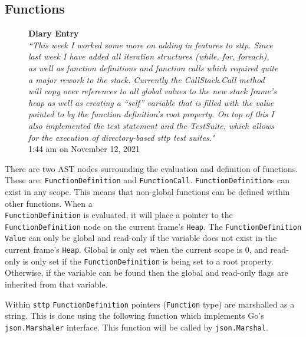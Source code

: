 \subsection{Functions}

\begin{figure}[H]
    \begin{center}
        \textbf{Diary Entry}\\[0.5em]
        \textit{``This week I worked some more on adding in features to sttp. Since last week I have added all iteration structures (while, for, foreach), as well as function definitions and function calls which required quite a major rework to the stack. Currently the CallStack.Call method will copy over references to all global values to the new stack frame’s heap as well as creating a “self” variable that is filled with the value pointed to by the function definition’s root property. On top of this I also implemented the test statement and the TestSuite, which allows for the execution of directory-based sttp test suites."}\\[0.5em]
        \tiny{1:44 am on November 12, 2021}
    \end{center}
\end{figure}

There are two AST nodes surrounding the evaluation and definition of functions. These are: \verb|FunctionDefinition| and \verb|FunctionCall|. \verb|FunctionDefinition|s can exist in any scope. This means that non-global functions can be defined within other functions. When a \\\verb|FunctionDefinition| is evaluated, it will place a pointer to the \verb|FunctionDefinition| node on the current frame's \verb|Heap|. The \verb|FunctionDefinition| \verb|Value| can only be global and read-only if the variable does not exist in the current frame's \verb|Heap|. Global is only set when the current scope is 0, and read-only is only set if the \verb|FunctionDefinition| is being set to a root property. Otherwise, if the variable can be found then the global and read-only flags are inherited from that variable.

Within \verb|sttp| \verb|FunctionDefinition| pointers (\verb|Function| type) are marshalled as a string. This is done using the following function which implements Go's \verb|json.Marshaler| interface. This function will be called by \verb|json.Marshal|.

\inputminted[firstline=374, lastline=379, autogobble, breaklines, tabsize=4]{go}{../../src/parser/functions.go}

